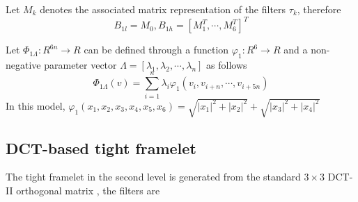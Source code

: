 \documentclass[UTF8]{article}
\begin{document}
Let $M_k$ denotes the associated matrix representation of the filters $\tau_k$, therefore
\begin{equation*}
	B_{1l} = M_0 , B_{1h} = [M_1^T,\cdots, M_6^T]^T
\end{equation*}
\par Let $\Phi_{1 \Lambda} : R^{6n} \rightarrow R$ can be defined through a function $\varphi_1:R^6 \rightarrow R$ and a non-negative parameter vector $\Lambda =[ \lambda_1, \lambda_2, \cdots, \lambda_n]$ as  follows
\begin{equation*}
	\Phi_{1 \Lambda}(v) = \sum_{i= 1}^{n} \lambda_i \varphi_1(v_i, v_{i+n}, \cdots, v_{i+5n})
\end{equation*}
In this model, $\varphi_1(x_1, x_2,x_3,x_4,x_5,x_6) = \sqrt{|x_1|^2+|x_2|^2}+\sqrt{|x_3|^2+|x_4|^2}$

\subsection{DCT-based tight framelet}
\par The tight framelet in the second level is generated from the standard $3 \times 3$ DCT-II orthogonal matrix , the filters are
\end{document}
